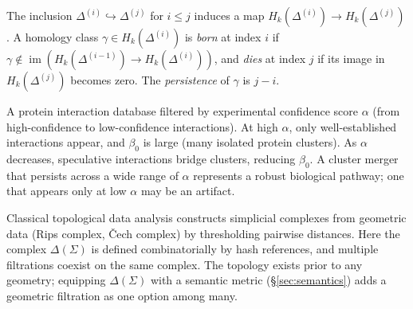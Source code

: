 \begin{definition}
\label{def:persistent-homology}
The inclusion $\Delta^{(i)} \hookrightarrow \Delta^{(j)}$ for $i \leq j$ induces a map $H_k(\Delta^{(i)}) \to H_k(\Delta^{(j)})$. A homology class $\gamma \in H_k(\Delta^{(i)})$ is \emph{born} at index $i$ if $\gamma \notin \operatorname{im}(H_k(\Delta^{(i-1)}) \to H_k(\Delta^{(i)}))$, and \emph{dies} at index $j$ if its image in $H_k(\Delta^{(j)})$ becomes zero. The \emph{persistence} of $\gamma$ is $j - i$.
\end{definition}

\begin{example}
A protein interaction database filtered by experimental confidence score $\alpha$ (from high-confidence to low-confidence interactions). At high $\alpha$, only well-established interactions appear, and $\beta_0$ is large (many isolated protein clusters). As $\alpha$ decreases, speculative interactions bridge clusters, reducing $\beta_0$. A cluster merger that persists across a wide range of $\alpha$ represents a robust biological pathway; one that appears only at low $\alpha$ may be an artifact.
\end{example}

\begin{remark}
Classical topological data analysis constructs simplicial complexes from geometric data (Rips complex, \v{C}ech complex) by thresholding pairwise distances. Here the complex $\Delta(\Sigma)$ is defined combinatorially by hash references, and multiple filtrations coexist on the same complex. The topology exists prior to any geometry; equipping $\Delta(\Sigma)$ with a semantic metric (\S\ref{sec:semantics}) adds a geometric filtration as one option among many.
\end{remark}
